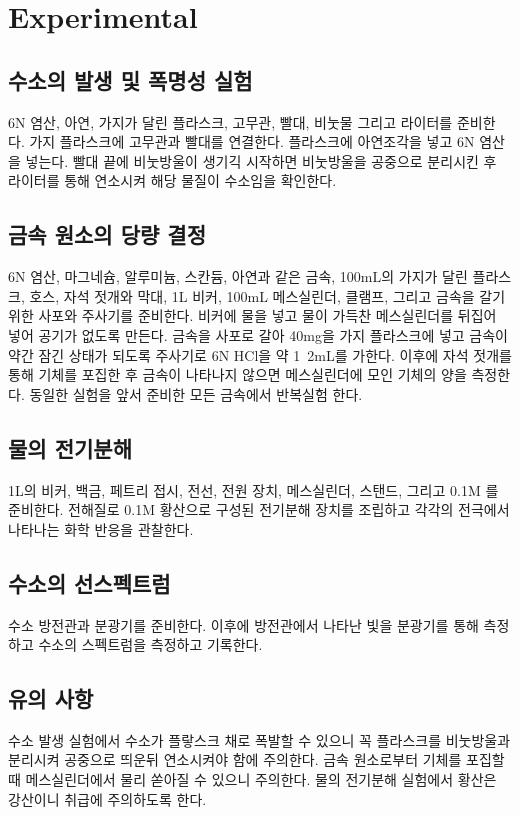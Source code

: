 \documentclass[%
 reprint,
 amsmath,amssymb,
 aps,
]{revtex4-2}
\begin{document}
\section{\label{sec:level1}Experimental}
\subsection{\label{sec:level2}수소의 발생 및 폭명성 실험}
6N 염산, 아연, 가지가 달린 플라스크, 고무관, 빨대, 비눗물 그리고 라이터를 준비한다. 가지 플라스크에 고무관과 빨대를 연결한다. 플라스크에 아연조각을 넣고 6N 염산을 넣는다. 빨대 끝에 비눗방울이 생기긱 시작하면 비눗방울을 공중으로 분리시킨 후 라이터를 통해 연소시켜 해당 물질이 수소임을 확인한다.

\subsection{\label{sec:level2}금속 원소의 당량 결정}
6N 염산, 마그네슘, 알루미늄, 스칸듐, 아연과 같은 금속, 100mL의 가지가 달린 플라스크, 호스, 자석 젓개와 막대, 1L 비커, 100mL 메스실린더, 클램프, 그리고 금속을 갈기 위한 사포와 주사기를 준비한다. 비커에 물을 넣고 물이 가득찬 메스실린더를 뒤집어 넣어 공기가 없도록 만든다. 금속을 사포로 갈아 40mg을 가지 플라스크에 넣고 금속이 약간 잠긴 상태가 되도록 주사기로 6N HCl을 약 1~2mL를 가한다. 이후에 자석 젓개를 통해 기체를 포집한 후 금속이 나타나지 않으면 메스실린더에 모인 기체의 양을 측정한다. 동일한 실험을 앞서 준비한 모든 금속에서 반복실험 한다.

\subsection{\label{sec:level2}물의 전기분해}
1L의 비커, 백금, 페트리 접시, 전선, 전원 장치, 메스실린더, 스탠드, 그리고 0.1M 를 준비한다. 전해질로 0.1M 황산으로 구성된 전기분해 장치를 조립하고 각각의 전극에서 나타나는 화학 반응을 관찰한다.

\subsection{\label{sec:level2}수소의 선스펙트럼}
수소 방전관과 분광기를 준비한다. 이후에 방전관에서 나타난 빛을 분광기를 통해 측정하고 수소의 스펙트럼을 측정하고 기록한다.

\subsection{\label{sec:level2}유의 사항}
수소 발생 실험에서 수소가 플랗스크 채로 폭발할 수 있으니 꼭 플라스크를 비눗방울과 분리시켜 공중으로 띄운뒤 연소시켜야 함에 주의한다. 금속 원소로부터 기체를 포집할 때 메스실린더에서 물리 쏟아질 수 있으니 주의한다. 물의 전기분해 실험에서 황산은 강산이니 취급에 주의하도록 한다.
\end{document}
